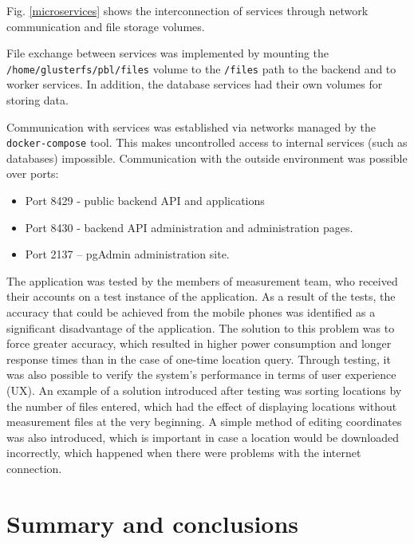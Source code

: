 \documentclass[a4paper,10pt]{article}
\begin{document}
\begin{multicols}{2}

  Fig. \ref{microservices} shows the interconnection of services through network
  communication and file storage volumes.

  File exchange between services was implemented by mounting the
  \texttt{/home/glusterfs/pbl/files} volume to the \texttt{/files} path to the
  backend and to worker services. In addition, the database services had their
  own volumes for storing data.

  Communication with services was established via networks managed by the
  \texttt{docker-compose} tool. This makes uncontrolled access to internal
  services (such as databases) impossible. Communication with the outside
  environment was possible over ports:

  \begin{itemize}
    \item Port 8429 - public backend API and applications
    \item Port 8430 - backend API administration and administration pages.
    \item Port 2137 – pgAdmin administration site.
  \end{itemize}

  The application was tested by the members of measurement team, who received
  their accounts on a test instance of the application. As a result of the
  tests, the accuracy that could be achieved from the mobile phones was
  identified as a significant disadvantage of the application. The solution to
  this problem was to force greater accuracy, which resulted in higher power
  consumption and longer response times than in the case of one-time location
  query. Through testing, it was also possible to verify the system's
  performance in terms of user experience (UX). An example of a solution
  introduced after testing was sorting locations by the number of files entered,
  which had the effect of displaying locations without measurement files at the
  very beginning. A simple method of editing coordinates was also introduced,
  which is important in case a location would be downloaded incorrectly, which
  happened when there were problems with the internet connection.

\end{multicols}

\section{Summary and conclusions}
\end{document}
